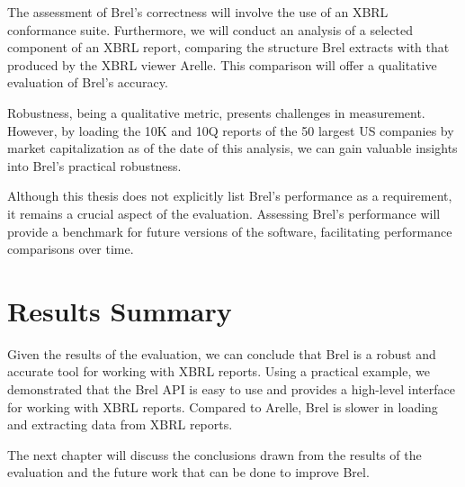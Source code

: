 The assessment of Brel's correctness will involve the use of an XBRL conformance suite. 
Furthermore, we will conduct an analysis of a selected component of an XBRL report, 
comparing the structure Brel extracts with that produced by the XBRL viewer Arelle. 
This comparison will offer a qualitative evaluation of Brel's accuracy.

Robustness, being a qualitative metric, presents challenges in measurement. 
However, by loading the 10K and 10Q reports of the 50 largest US companies by market capitalization as of the date of this analysis, 
we can gain valuable insights into Brel's practical robustness.

Although this thesis does not explicitly list Brel's performance as a requirement, 
it remains a crucial aspect of the evaluation. 
Assessing Brel's performance will provide a benchmark for future versions of the software, 
facilitating performance comparisons over time.









\section{Results Summary}
Given the results of the evaluation, we can conclude that Brel is a robust and accurate tool for working with XBRL reports.
Using a practical example, we demonstrated that the Brel API is easy to use and provides a high-level interface for working with XBRL reports.
Compared to Arelle, Brel is slower in loading and extracting data from XBRL reports.

The next chapter will discuss the conclusions drawn from the results of the evaluation and the future work that can be done to improve Brel.
